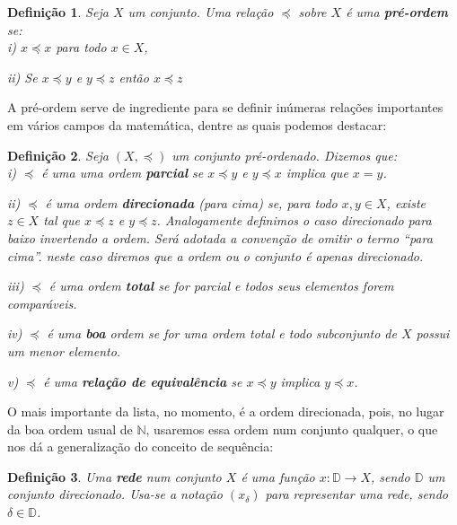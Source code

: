 \documentclass[12pt, a4paper]{article}
\newtheorem{mydef}{Definição}[section]
\theoremstyle{definition}
\begin{document}
\begin{mydef}
	Seja $X$ um conjunto. Uma relação $\preccurlyeq$ sobre $X$ é uma \textbf{pré-ordem} se: \\
	
	i) $x\preccurlyeq x$ para todo $x\in X$, \
	
	ii) Se $x\preccurlyeq y$ e $y\preccurlyeq z$ então $x\preccurlyeq z$	
	
\end{mydef}

A pré-ordem serve de ingrediente para se definir inúmeras relações importantes em vários campos da matemática, dentre as quais podemos destacar:

\begin{mydef}
	Seja $(X,\preccurlyeq )$ um conjunto pré-ordenado. Dizemos que:\\	
	
	i)  $\preccurlyeq$ é uma uma ordem \textbf{parcial} se $x\preccurlyeq y$ e $y\preccurlyeq x$ implica que $x=y$.\
	
	ii) $\preccurlyeq$ é uma ordem \textbf{direcionada} (para cima) se, para todo $x,y\in X$, existe $z\in X$ tal que $x\preccurlyeq z$ e $y\preccurlyeq z$. Analogamente definimos o caso direcionado para baixo invertendo a ordem. Será adotada a convenção de omitir o termo ``para cima''. neste caso diremos que a ordem ou o conjunto é apenas direcionado. \
	
	iii) $\preccurlyeq$ é uma ordem \textbf{total} se for parcial e todos seus elementos forem comparáveis.\
	
	iv) $\preccurlyeq$ é uma \textbf{boa} ordem se for uma ordem total e todo subconjunto de $X$ possui um menor elemento. \
	
	v) $\preccurlyeq$ é uma \textbf{relação de equivalência} se  $x\preccurlyeq y$ implica  $y\preccurlyeq x$.
	
	
\end{mydef}

O mais importante da lista, no momento, é a ordem direcionada, pois, no lugar da boa ordem usual de $\mathbb{N}$, usaremos essa ordem num conjunto qualquer, o que nos dá a generalização do conceito de sequência: 

\begin{mydef}
	Uma \textbf{rede} num conjunto $X$ é uma função $x: \mathbb{D} \rightarrow X$, sendo $\mathbb{D}$ um conjunto direcionado. Usa-se a notação $(x_{\delta })$ para representar uma rede, sendo $\delta \in \mathbb{D}$.	
\end{mydef}
\end{document}
